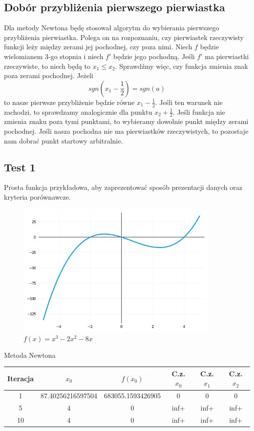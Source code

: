 \documentclass[a4paper]{article}
\begin{document}
    \subsection{Dobór przybliżenia pierwszego pierwiastka}
    Dla metody Newtona będę stosował algorytm do wybierania pierwszego przybliżenia pierwiastka. Polega 
    on na rozpoznaniu, czy pierwiastek rzeczywisty funkcji leży między zerami jej pochodnej, czy poza nimi. Niech
    $f$ będzie wielomianem 3-go stopnia i niech $f'$ będzie jego pochodną. Jeśli $f'$ ma pierwiastki rzeczywiste,
    to niech będą to $x_1 \leq x_2$. Sprawdźmy więc, czy funkcja zmienia znak poza zerami pochodnej. Jeżeli
    \[
        sgn(x_1 - \frac{1}{2}) = sgn(a)  
    \]
    to nasze pierwsze przybliżenie będzie równe $x_1 - \frac{1}{2}$. Jeśli ten warunek nie zachodzi, to 
    sprawdzamy analogicznie dla punktu $x_2 + \frac{1}{2}$. Jeśli funkcja nie zmienia znaku poza tymi punktami, 
    to wybieramy dowolnie punkt między zerami pochodnej. Jeśli nasza pochodna nie ma pierwiastków rzeczywistych, 
    to pozostaje nam dobrać punkt startowy arbitralnie.

\newpage
\subsection{Test 1}
    Prosta funkcja przykładowa, aby zaprezentować sposób prezentacji danych oraz kryteria porównawcze.
    \begin{figure}[h]
        \centering
        \includegraphics[width=10cm]{1}
        \caption{$f(x) = x^3 - 2x^2 - 8x$}
    \end{figure}
    
    \begin{center}
        Metoda Newtona
    \end{center}
    \begin{center}
        \begin{tabular}{|c|c|c|c|c|c|} 
            \hline
            Iteracja & $x_0$ & $f(x_0)$ & C.z. $x_0$ & C.z. $x_1$ & C.z. $x_2$ \\
            \hline
            1 & 87.40256216597504 & 683055.1593426905 & 0 & 0 & 0 \\
            \hline
            5 & 4 & 0 & inf+ & inf+ & inf+ \\
            \hline
            10 & 4 & 0 & inf+ & inf+ & inf+ \\
            \hline
        \end{tabular}
    \end{center}
        
\end{document}
